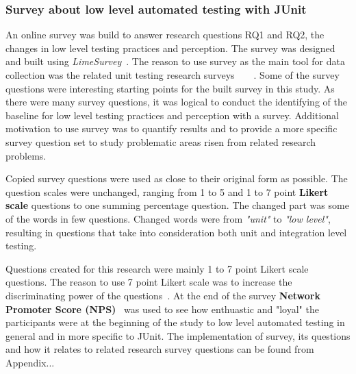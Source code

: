    \subsubsection{Survey about low level automated testing with JUnit}
    An online survey was build to answer research questions RQ1 and RQ2, the changes in low level testing practices and perception.
    The survey was designed and built using \textit{LimeSurvey}~\cite{limesurvey}. The reason to use survey as the main tool for data collection
    was the related unit testing research surveys~\cite{runeson2006survey}~\cite{williams2009effectiveness}~\cite{daka2014survey}~\cite{li2016automatically}.
    Some of the survey questions were interesting starting points
    for the built survey in this study. As there were many survey questions, it was logical to conduct the identifying
    of the baseline for low level testing practices and perception with a survey. Additional motivation to use
    survey was to quantify results and to provide a more specific survey question set to study problematic
    areas risen from related research problems.

    Copied survey questions were used as close to their original form as possible.
    The question scales were unchanged, ranging from 1 to 5 and 1 to 7 point \textbf{Likert scale} questions
    to one summing percentage question. The changed part was some of the words in few questions.
    Changed words were from \textit{"unit"} to \textit{"low level"},
    resulting in questions that take into consideration both unit and integration level testing.

    Questions created for this research were mainly 1 to 7 point Likert scale questions.
    The reason to use 7 point Likert scale was to increase the discriminating power of the questions~\cite{cummins2000we}.
    At the end of the survey \textbf{Network Promoter Score (NPS)}~\cite{reichheld2003one} was used to see how enthuastic and "loyal" the participants
    were at the beginning of the study to low level automated testing in general and in more specific to JUnit.
    The implementation of survey, its questions and how it relates to related research survey questions can be found from Appendix...
